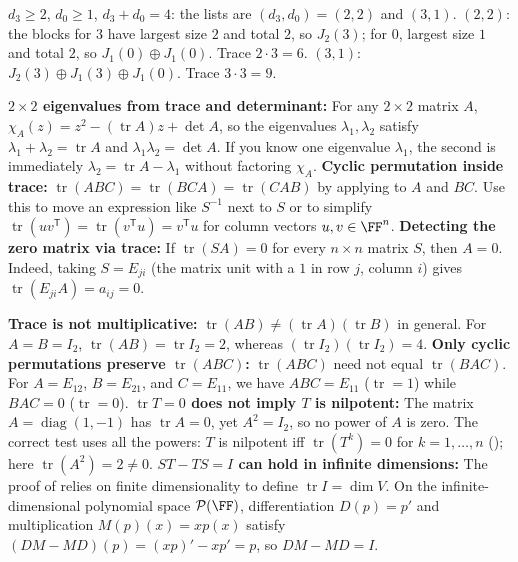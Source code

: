 \documentclass[10pt]{scrartcl}
\DeclareMathOperator{\tr}{tr}\DeclareMathOperator{\nul}{null}\DeclareMathOperator{\range}{range}\DeclareMathOperator{\spn}{span}
\newcommand{\LL}{\mathcal L}\newcommand{\PP}{\mathcal P}\newcommand{\MM}{\mathcal M}
\begin{document}
\begin{example*}[$T\in\LL(\CC^4)$ with $m_T=(x-3)^2x$]
  \begin{steps}
    \ii $d_3\ge2$, $d_0\ge1$, $d_3+d_0=4$: the lists are $(d_3,d_0)=(2,2)$ and $(3,1)$.
    \ii $(2,2)$: the blocks for $3$ have largest size $2$ and total $2$, so $J_2(3)$; for $0$, largest size $1$ and total $2$, so $J_1(0)\oplus J_1(0)$. Trace $2\cdot3=6$.
    \ii $(3,1)$: $J_2(3)\oplus J_1(3)\oplus J_1(0)$. Trace $3\cdot3=9$.
  \end{steps}
\end{example*}

\begin{shortcuts}
  \ii \textbf{$2\times 2$ eigenvalues from trace and determinant:} For any $2\times 2$ matrix $A$, $\chi_A(z)=z^2-(\tr A)z+\det A$, so the eigenvalues $\lambda_1,\lambda_2$ satisfy $\lambda_1+\lambda_2=\tr A$ and $\lambda_1\lambda_2=\det A$. If you know one eigenvalue $\lambda_1$, the second is immediately $\lambda_2=\tr A-\lambda_1$ without factoring $\chi_A$.
  \ii \textbf{Cyclic permutation inside trace:} $\tr(ABC)=\tr(BCA)=\tr(CAB)$ by applying  to $A$ and $BC$. Use this to move an expression like $S^{-1}$ next to $S$ or to simplify $\tr(uv^{\mathsf T})=\tr(v^{\mathsf T}u)=v^{\mathsf T}u$ for column vectors $u,v\in\FF^n$.
  \ii \textbf{Detecting the zero matrix via trace:} If $\tr(SA)=0$ for every $n\times n$ matrix $S$, then $A=0$. Indeed, taking $S=E_{ji}$ (the matrix unit with a $1$ in row $j$, column $i$) gives $\tr(E_{ji}A)=a_{ij}=0$.
\end{shortcuts}

\begin{trapbox}
  \ii \textbf{Trace is not multiplicative:} $\tr(AB)\ne(\tr A)(\tr B)$ in general. For $A=B=I_2$, $\tr(AB)=\tr I_2=2$, whereas $(\tr I_2)(\tr I_2)=4$.
  \ii \textbf{Only cyclic permutations preserve $\tr(ABC)$:} $\tr(ABC)$ need not equal $\tr(BAC)$. For $A=E_{12}$, $B=E_{21}$, and $C=E_{11}$, we have $ABC=E_{11}$ ($\tr=1$) while $BAC=0$ ($\tr=0$).
  \ii \textbf{$\tr T=0$ does not imply $T$ is nilpotent:} The matrix $A=\operatorname{diag}(1,-1)$ has $\tr A=0$, yet $A^2=I_2$, so no power of $A$ is zero. The correct test uses all the powers: $T$ is nilpotent iff $\tr(T^k)=0$ for $k=1,\dots,n$ (); here $\tr(A^2)=2\ne0$.
  \ii \textbf{$ST-TS=I$ can hold in infinite dimensions:} The proof of  relies on finite dimensionality to define $\tr I=\dim V$. On the infinite-dimensional polynomial space $\PP(\FF)$, differentiation $D(p)=p'$ and multiplication $M(p)(x)=xp(x)$ satisfy $(DM-MD)(p)=(xp)'-xp'=p$, so $DM-MD=I$.
\end{trapbox}
\end{document}
